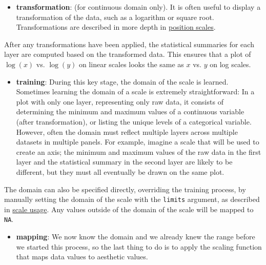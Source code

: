 \begin{itemize}
\itemsep1pt\parskip0pt
\item
  \textbf{transformation}: (for continuous domain only). It is often
  useful to display a transformation of the data, such as a logarithm or
  square root. Transformations are described in more depth in
  \hyperref[sub:scale-position]{position scales}.
\end{itemize}

After any transformations have been applied, the statistical summaries
for each layer are computed based on the transformed data. This ensures
that a plot of \(\log(x)\) vs. \(\log(y)\) on linear scales looks the
same as \(x\) vs. \(y\) on log scales.

\begin{itemize}
\itemsep1pt\parskip0pt
\item
  \textbf{training}: During this key stage, the domain of the scale is
  learned. Sometimes learning the domain of a scale is extremely
  straightforward: In a plot with only one layer, representing only raw
  data, it consists of determining the minimum and maximum values of a
  continuous variable (after transformation), or listing the unique
  levels of a categorical variable. However, often the domain must
  reflect multiple layers across multiple datasets in multiple panels.
  For example, imagine a scale that will be used to create an axis; the
  minimum and maximum values of the raw data in the first layer and the
  statistical summary in the second layer are likely to be different,
  but they must all eventually be drawn on the same plot.
\end{itemize}

The domain can also be specified directly, overriding the training
process, by manually setting the domain of the scale with the
\texttt{limits} argument, as described in
\hyperref[sec:scale-usage]{scale usage}. Any values outside of the
domain of the scale will be mapped to \texttt{NA}.

\begin{itemize}
\itemsep1pt\parskip0pt
\item
  \textbf{mapping}: We now know the domain and we already knew the range
  before we started this process, so the last thing to do is to apply
  the scaling function that maps data values to aesthetic values.
\end{itemize}

